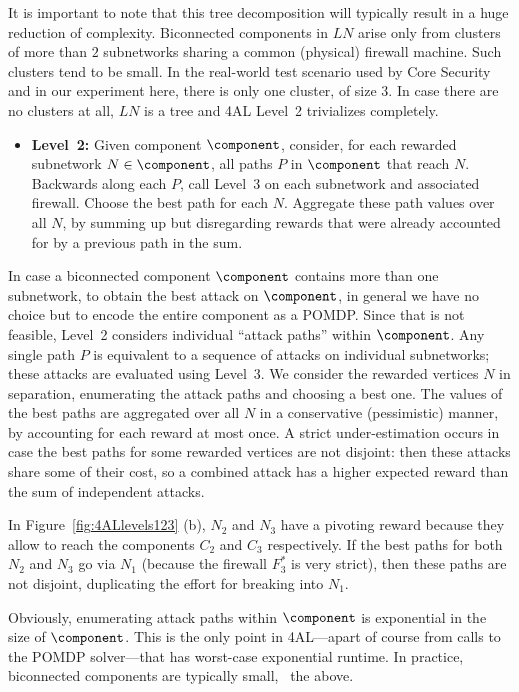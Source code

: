 It is important to note that this tree decomposition will typically
result in a huge reduction of complexity. Biconnected components in
$LN$ arise only from clusters of more than $2$ subnetworks sharing a
common (physical) firewall machine. Such clusters tend to be small. In
the real-world test scenario used by Core Security and in our
experiment here, there is only one cluster, of size $3$. In case there
are no clusters at all, $LN$ is a tree and 4AL Level~2 trivializes
completely.

\vspace{-0.05cm}
\begin{itemize}
\item \textbf{Level~2:} Given component $\component$, consider, for
  each rewarded subnetwork $N \in \component$, all paths $P$ in
  $\component$ that reach $N$. Backwards along each $P$, call Level~3
  on each subnetwork and associated firewall. Choose the best path for
  each $N$. Aggregate these path values over all $N$, by summing up
  but disregarding rewards that were already accounted for by a
  previous path in the sum.
\end{itemize}
\vspace{-0.05cm}

In case a biconnected component $\component$ contains more than one
subnetwork, to obtain the best attack on $\component$, in general we
have no choice but to encode the entire component as a POMDP. Since
that is not feasible, Level~2 considers individual ``attack paths''
within $\component$. Any single path $P$ is equivalent to a sequence
of attacks on individual subnetworks; these attacks are evaluated
using Level~3. We consider the rewarded vertices $N$ in separation,
enumerating the attack paths and choosing a best one.  The values of
the best paths are aggregated over all $N$ in a conservative
(pessimistic) manner, by accounting for each reward at most once. A
strict under-estimation occurs in case the best paths for some
rewarded vertices are not disjoint: then these attacks share some of
their cost, so a combined attack has a higher expected reward than the
sum of independent attacks.

In Figure~\ref{fig:4ALlevels123} (b), $N_2$ and $N_3$ have a pivoting
reward because they allow to reach the components $C_2$ and $C_3$
respectively. If the best paths for both $N_2$ and $N_3$ go via $N_1$
(because the firewall $F^*_3$ is very strict), then these paths are
not disjoint, duplicating the effort for breaking into $N_1$.

Obviously, enumerating attack paths within $\component$ is exponential
in the size of $\component$. This is the only point in 4AL---apart of
course from calls to the POMDP solver---that has worst-case
exponential runtime. In practice, biconnected components are typically
small, \cf\ the above.

